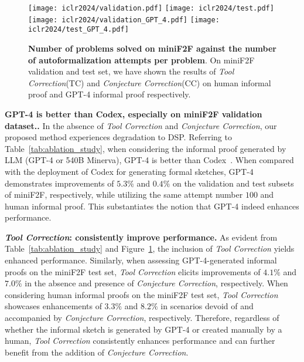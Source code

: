 \documentclass{article} \usepackage{iclr2024_conference,times}
\def\methodOne{TC\xspace}
\def\methodOneFull{\textit{Tool Correction}\xspace}
\def\methodTwo{CC\xspace}
\def\methodTwoFull{\textit{Conjecture Correction}\xspace}
\begin{document}
\begin{figure}[t]
\setlength{\abovecaptionskip}{0.1cm}
\centering
\texttt{[image: iclr2024/validation.pdf]}
\hspace{0in}
\texttt{[image: iclr2024/test.pdf]}
\hspace{0in}
\texttt{[image: iclr2024/validation\_GPT\_4.pdf]}
\hspace{0in}
\texttt{[image: iclr2024/test\_GPT\_4.pdf]}
\caption{
\small
\textbf{Number of problems solved on miniF2F against the number of autoformalization attempts per problem}. On miniF2F validation and test set, we have shown the results of \methodOneFull (\methodOne) and \methodTwoFull (\methodTwo) on human informal proof and GPT-4 informal proof respectively.
}
\label{fig: ablation}
\vspace{-15pt}
\end{figure}
\textbf{GPT-4 is better than Codex, especially on miniF2F validation dataset..} In the absence of \methodOneFull and \methodTwoFull, our proposed method experiences degradation to DSP. Referring to  Table~\ref{tab:ablation_study}, when considering the informal proof generated by LLM (GPT-4 or 540B Minerva), GPT-4 is better than Codex~\citep{chen2021evaluating}. When compared with the deployment of Codex for generating formal sketches, GPT-4 demonstrates improvements of $5.3\%$ and $0.4\%$ on the validation and test subsets of miniF2F, respectively, while utilizing the same attempt number $100$ and human informal proof. This substantiates the notion that GPT-4 indeed enhances performance. 

\textbf{\methodOneFull: consistently improve performance.} As evident from Table~\ref{tab:ablation_study} and Figure~\ref{fig: ablation}, the inclusion of \methodOneFull yields enhanced performance. Similarly,  when assessing GPT-4-generated informal proofs on the miniF2F test set, \methodOneFull elicits improvements of $4.1\%$ and $7.0\%$ in the absence and presence of \methodTwoFull, respectively. When considering human informal proofs on the miniF2F test set, \methodOneFull showcases enhancements of $3.3\%$ and $8.2\%$ in scenarios devoid of and accompanied by \methodTwoFull, respectively. Therefore, regardless of whether the informal sketch is generated by GPT-4 or created manually by a human, \methodOneFull consistently enhances performance and can further benefit from the addition of \methodTwoFull.
\end{document}
